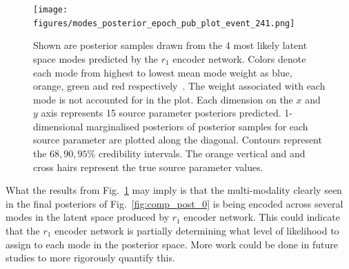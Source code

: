 %
%
\begin{figure}
    \texttt{[image: figures/modes\_posterior\_epoch\_pub\_plot\_event\_241.png]}
    \caption[Modal posterior corner plot for the 1st~ test sample in the \texttt{VItamin} paper training set.]{\label{fig:mode_corner_0} Shown are posterior samples drawn from the 4 most likely latent space modes predicted by the $r_1$ encoder network. Colors denote each mode from highest to lowest mean mode weight as blue, orange, green and red respectively~. The weight associated with each mode is not accounted for in the plot. Each dimension on the $x$ and $y$ axis represents 15 source parameter posteriors predicted. 1-dimensional marginalised posteriors of posterior samples for each source parameter are plotted along the diagonal. Contours represent the $68, 90, 95\%$ credibility intervals. The orange vertical and and cross hairs represent the true source parameter values.~}
\end{figure}

What the results from Fig.~\ref{fig:mode_corner_0} may imply 
is that the multi-modality clearly seen 
in the final posteriors of Fig.~\ref{fig:comp_post_0} is being encoded across 
several modes in the latent space produced by $r_1$ encoder network. This 
could indicate that the $r_1$ encoder network
is partially determining what level of likelihood to assign to each 
mode in the posterior space. More work could be done in future 
studies to more rigorously quantify this.

%
%


